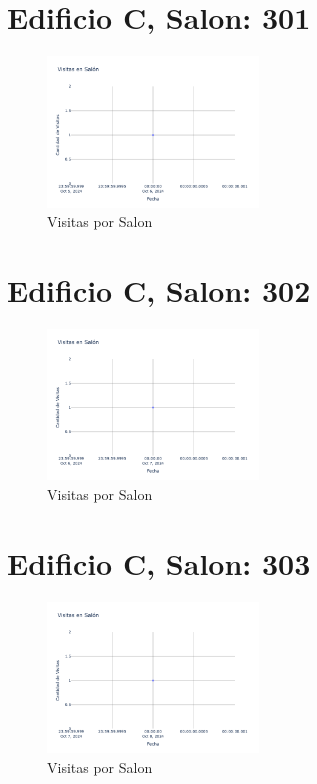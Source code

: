 \documentclass{article}
\begin{document}
    

    \section{Edificio C, Salon: 301}
    \begin{figure}
        \centering
        \includegraphics[width=0.5\textwidth]{../img/poli/VS301-90Dias-03-12-2024.png}
        \caption{Visitas por Salon}
    \end{figure}

    

    \section{Edificio C, Salon: 302}
    \begin{figure}
        \centering
        \includegraphics[width=0.5\textwidth]{../img/poli/VS302-90Dias-03-12-2024.png}
        \caption{Visitas por Salon}
    \end{figure}

    

    \section{Edificio C, Salon: 303}
    \begin{figure}
        \centering
        \includegraphics[width=0.5\textwidth]{../img/poli/VS303-90Dias-03-12-2024.png}
        \caption{Visitas por Salon}
    \end{figure}
\end{document}
